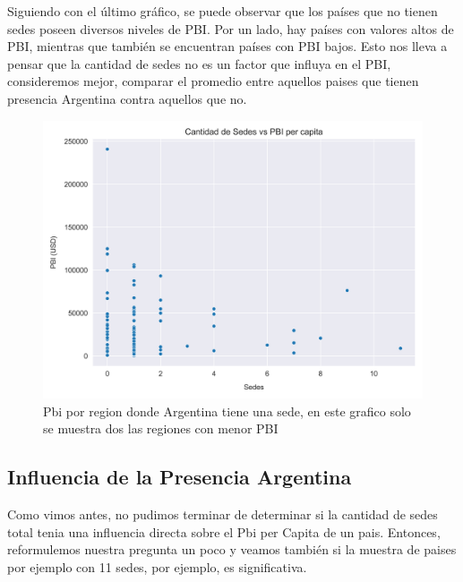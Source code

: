 \documentclass[10pt,a4paper]{article}
\begin{document}
Siguiendo con el último gráfico, se puede observar que los países que no tienen sedes  poseen  diversos  niveles de PBI. Por un lado, hay países con valores altos de PBI, mientras que también se encuentran países con PBI bajos. Esto nos lleva a pensar que la cantidad de sedes no es un factor que influya en el PBI, consideremos mejor, comparar el promedio entre aquellos paises que tienen presencia Argentina contra aquellos que no. 

\newpage

\begin{figure}[!] %
  \centering
  \includegraphics[width=1\textwidth]{plot_pbi.png}
  \caption{ Pbi por region donde Argentina tiene una sede, en este grafico solo se muestra dos las regiones con menor PBI }
  \label{fig:Tabla 2}
\end{figure} \vspace{0.1cm}


\subsection{Influencia de la Presencia Argentina} \vspace{0.3cm}

Como vimos antes, no pudimos terminar de determinar si la cantidad de sedes total tenia una influencia directa sobre el Pbi per Capita de un pais. Entonces, reformulemos nuestra pregunta un poco y veamos también si la muestra de paises por ejemplo con 11 sedes, por ejemplo, es significativa.

\newpage
\end{document}
